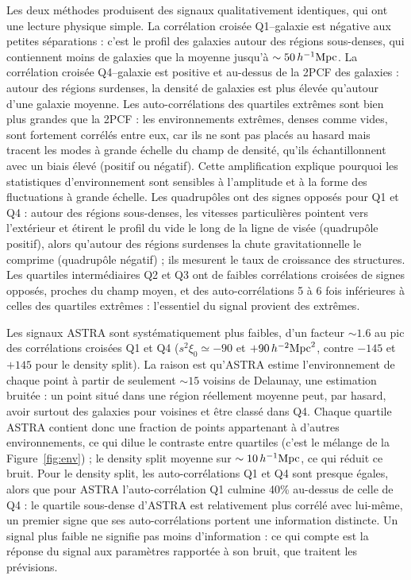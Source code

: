 Les deux méthodes produisent des signaux qualitativement identiques, qui ont une lecture physique simple. La corrélation croisée Q1--galaxie est négative aux petites séparations : c'est le profil des galaxies autour des régions sous-denses, qui contiennent moins de galaxies que la moyenne jusqu'à $\sim50\,h^{-1}\mathrm{Mpc}$. La corrélation croisée Q4--galaxie est positive et au-dessus de la 2PCF des galaxies : autour des régions surdenses, la densité de galaxies est plus élevée qu'autour d'une galaxie moyenne. Les auto-corrélations des quartiles extrêmes sont bien plus grandes que la 2PCF : les environnements extrêmes, denses comme vides, sont fortement corrélés entre eux, car ils ne sont pas placés au hasard mais tracent les modes à grande échelle du champ de densité, qu'ils échantillonnent avec un biais élevé (positif ou négatif). Cette amplification explique pourquoi les statistiques d'environnement sont sensibles à l'amplitude et à la forme des fluctuations à grande échelle. Les quadrupôles ont des signes opposés pour Q1 et Q4 : autour des régions sous-denses, les vitesses particulières pointent vers l'extérieur et étirent le profil du vide le long de la ligne de visée (quadrupôle positif), alors qu'autour des régions surdenses la chute gravitationnelle le comprime (quadrupôle négatif) ; ils mesurent le taux de croissance des structures. Les quartiles intermédiaires Q2 et Q3 ont de faibles corrélations croisées de signes opposés, proches du champ moyen, et des auto-corrélations 5 à 6 fois inférieures à celles des quartiles extrêmes : l'essentiel du signal provient des extrêmes.

Les signaux ASTRA sont systématiquement plus faibles, d'un facteur $\sim1.6$ au pic des corrélations croisées Q1 et Q4 ($s^2\xi_0\simeq-90$ et $+90\,h^{-2}{\rm Mpc}^2$, contre $-145$ et $+145$ pour le density split). La raison est qu'ASTRA estime l'environnement de chaque point à partir de seulement $\sim15$ voisins de Delaunay, une estimation bruitée : un point situé dans une région réellement moyenne peut, par hasard, avoir surtout des galaxies pour voisines et être classé dans Q4. Chaque quartile ASTRA contient donc une fraction de points appartenant à d'autres environnements, ce qui dilue le contraste entre quartiles (c'est le mélange de la Figure~\ref{fig:env}) ; le density split moyenne sur $\sim10\,h^{-1}\mathrm{Mpc}$, ce qui réduit ce bruit. Pour le density split, les auto-corrélations Q1 et Q4 sont presque égales, alors que pour ASTRA l'auto-corrélation Q1 culmine 40\% au-dessus de celle de Q4 : le quartile sous-dense d'ASTRA est relativement plus corrélé avec lui-même, un premier signe que ses auto-corrélations portent une information distincte. Un signal plus faible ne signifie pas moins d'information : ce qui compte est la réponse du signal aux paramètres rapportée à son bruit, que traitent les prévisions.

